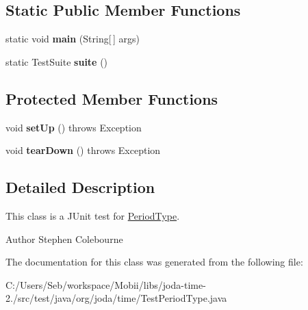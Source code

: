\subsection*{Static Public Member Functions}
\begin{DoxyCompactItemize}
\item 
\hypertarget{classorg_1_1joda_1_1time_1_1_test_period_type_a6204753ab28244eed58657b160eb5595}{static void {\bfseries main} (String\mbox{[}$\,$\mbox{]} args)}\label{classorg_1_1joda_1_1time_1_1_test_period_type_a6204753ab28244eed58657b160eb5595}

\item 
\hypertarget{classorg_1_1joda_1_1time_1_1_test_period_type_a1b26b51e5ab22ac25d09a8650081070e}{static Test\-Suite {\bfseries suite} ()}\label{classorg_1_1joda_1_1time_1_1_test_period_type_a1b26b51e5ab22ac25d09a8650081070e}

\end{DoxyCompactItemize}
\subsection*{Protected Member Functions}
\begin{DoxyCompactItemize}
\item 
\hypertarget{classorg_1_1joda_1_1time_1_1_test_period_type_af9b19606cbb83f94637af7842d9c4a0c}{void {\bfseries set\-Up} ()  throws Exception }\label{classorg_1_1joda_1_1time_1_1_test_period_type_af9b19606cbb83f94637af7842d9c4a0c}

\item 
\hypertarget{classorg_1_1joda_1_1time_1_1_test_period_type_ad303403bd88dcad67afbc9f66a5bce4d}{void {\bfseries tear\-Down} ()  throws Exception }\label{classorg_1_1joda_1_1time_1_1_test_period_type_ad303403bd88dcad67afbc9f66a5bce4d}

\end{DoxyCompactItemize}


\subsection{Detailed Description}
This class is a J\-Unit test for \hyperlink{classorg_1_1joda_1_1time_1_1_period_type}{Period\-Type}.

\begin{DoxyAuthor}{Author}
Stephen Colebourne 
\end{DoxyAuthor}


The documentation for this class was generated from the following file\-:\begin{DoxyCompactItemize}
\item 
C\-:/\-Users/\-Seb/workspace/\-Mobii/libs/joda-\/time-\/2./src/test/java/org/joda/time/Test\-Period\-Type.\-java\end{DoxyCompactItemize}
